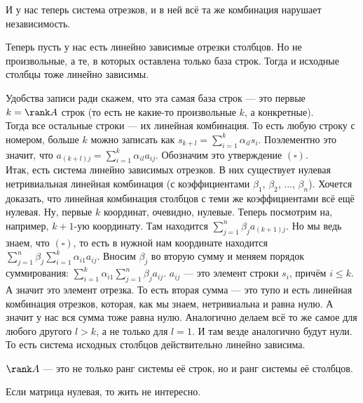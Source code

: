\documentclass{article}
\begin{document}
\begin{itemize}
\begin{Proof}
$$            $$
            И у нас теперь система отрезков, и в ней всё та же комбинация нарушает независимость.
        \end{Proof}
        \thm Теперь пусть у нас есть линейно зависимые отрезки столбцов. Но не произвольные, а те, в которых оставлена только база строк. Тогда и исходные столбцы тоже линейно зависимы.
        \begin{Proof}
            Удобства записи ради скажем, что эта самая база строк --- это первые $k=\rank A$ строк (то есть не какие-то произвольные $k$, а конкретные).\\
            Тогда все остальные строки --- их линейная комбинация. То есть любую строку с номером, больше $k$ можно записать как $s_{k+l}=\sum\limits_{i=1}^k\alpha_{il}s_i$. Поэлементно это значит, что $a_{(k+l)j}=\sum\limits_{i=1}^k\alpha_{il}a_{ij}$. Обозначим это утверждение $(\square)$.\\
            Итак, есть система линейно зависимых отрезков. В них существует нулевая нетривиальная линейная комбинация (с коэффициентами $\beta_1$, $\beta_2$, ..., $\beta_n$). Хочется доказать, что линейная комбинация столбцов с теми же коэффициентами всё ещё нулевая. Ну, первые $k$ координат, очевидно, нулевые. Теперь посмотрим на, например, $k+1$-ую координату. Там находится $\sum\limits_{j=1}^n\beta_ja_{(k+1)j}$. Но мы ведь знаем, что $(\square)$, то есть в нужной нам координате находится $\sum\limits_{j=1}^n\beta_j\sum\limits_{i=1}^k\alpha_{i1}a_{ij}$. Вносим $\beta_j$ во вторую сумму и меняем порядок суммирования: $\sum\limits_{i=1}^k\alpha_{i1}\sum\limits_{j=1}^n\beta_ja_{ij}$. $a_{ij}$ --- это элемент строки $s_i$, причём $i\leqslant k$. А значит это элемент отрезка. То есть вторая сумма --- это тупо и есть линейная комбинация отрезков, которая, как мы знаем, нетривиальна и равна нулю. А значит у нас вся сумма тоже равна нулю. Аналогично делаем всё то же самое для любого другого $l>k$, а не только для $l=1$. И там везде аналогично будут нули. То есть система исходных столбцов действительно линейно зависима.
        \end{Proof}
        \thm $\rank A$ --- это не только ранг системы её строк, но и ранг системы её столбцов.
        \begin{Proof}
            Если матрица нулевая, то жить не интересно.\\

\end{Proof}
\end{itemize}
\end{document}
